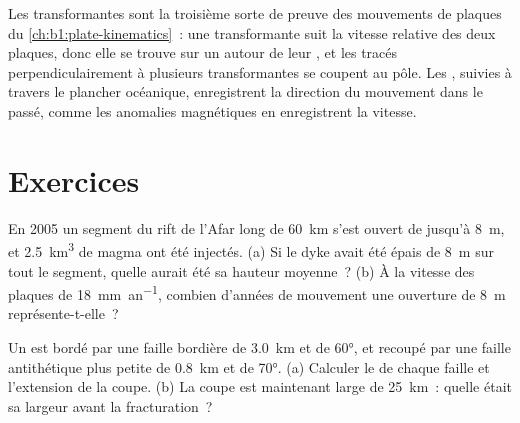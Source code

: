 \begin{omfigure}
\par{}
\label{fig:b1:rifts-ridges-margins:transform}
\end{omfigure}

Les transformantes sont la troisième sorte de preuve des mouvements de plaques du
\cref{ch:b1:plate-kinematics}~: une transformante suit la vitesse relative des
deux plaques, donc elle se trouve sur un  autour de leur , et les
 tracés perpendiculairement à plusieurs transformantes se coupent au pôle.
Les , suivies à travers le plancher océanique, enregistrent la direction du mouvement
dans le passé, comme les anomalies magnétiques en enregistrent la vitesse.

\section{Exercices}

\begin{exercise}[$\star$]\label{exo:b1:rifts-ridges-margins:1}
En 2005 un segment du rift de l'Afar long de \qty{60}{km} s'est ouvert de
jusqu'à \qty{8}{m}, et \qty{2.5}{km^3} de magma ont été injectés. (a) Si le dyke avait
été épais de \qty{8}{m} sur tout le segment, quelle aurait été sa hauteur moyenne~?
(b) À la vitesse des plaques de \qty{18}{mm.an^{-1}}, combien d'années de mouvement
une ouverture de \qty{8}{m} représente-t-elle~?
\end{exercise}

\begin{exercise}[$\star$]\label{exo:b1:rifts-ridges-margins:2}
Un  est bordé par une faille bordière de  \qty{3.0}{km} et de 
\ang{60}, et recoupé par une faille antithétique plus petite de  \qty{0.8}{km} et de 
\ang{70}. (a) Calculer le  de chaque faille et l'extension de la coupe.
(b) La coupe est maintenant large de \qty{25}{km}~: quelle était sa largeur avant la fracturation~?
\end{exercise}

